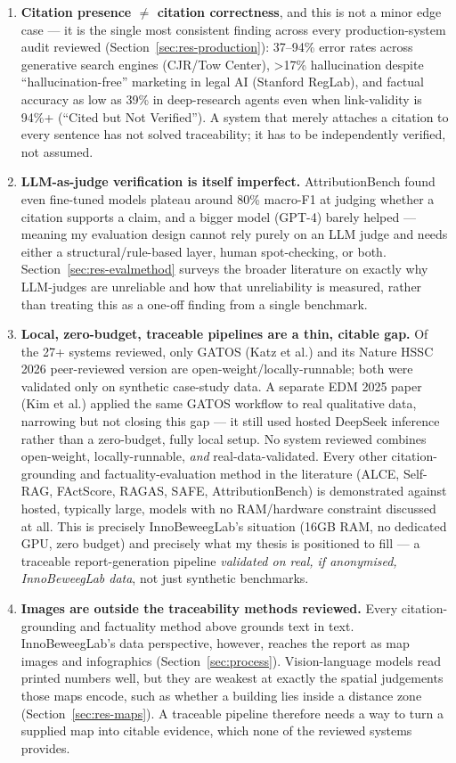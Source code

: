 \begin{enumerate}
\item \textbf{Citation presence $\neq$ citation correctness}, and this is not a minor edge case — it is the single most consistent finding across every production-system audit reviewed (Section~\ref{sec:res-production}): 37–94\% error rates across generative search engines (CJR/Tow Center), >17\% hallucination despite \textquotedblleft{}hallucination-free\textquotedblright{} marketing in legal AI (Stanford RegLab), and factual accuracy as low as 39\% in deep-research agents even when link-validity is 94\%+ (\textquotedblleft{}Cited but Not Verified\textquotedblright{}). A system that merely attaches a citation to every sentence has not solved traceability; it has to be independently verified, not assumed.
\item \textbf{LLM-as-judge verification is itself imperfect.} AttributionBench found even fine-tuned models plateau around 80\% macro-F1 at judging whether a citation supports a claim, and a bigger model (GPT-4) barely helped — meaning my evaluation design cannot rely purely on an LLM judge and needs either a structural/rule-based layer, human spot-checking, or both. Section~\ref{sec:res-evalmethod} surveys the broader literature on exactly why LLM-judges are unreliable and how that unreliability is measured, rather than treating this as a one-off finding from a single benchmark.
\item \textbf{Local, zero-budget, traceable pipelines are a thin, citable gap.} Of the 27+ systems reviewed, only GATOS (Katz et al.) and its Nature HSSC 2026 peer-reviewed version are open-weight/locally-runnable; both were validated only on synthetic case-study data. A separate EDM 2025 paper (Kim et al.) applied the same GATOS workflow to real qualitative data, narrowing but not closing this gap — it still used hosted DeepSeek inference rather than a zero-budget, fully local setup. No system reviewed combines open-weight, locally-runnable, \textit{and} real-data-validated. Every other citation-grounding and factuality-evaluation method in the literature (ALCE, Self-RAG, FActScore, RAGAS, SAFE, AttributionBench) is demonstrated against hosted, typically large, models with no RAM/hardware constraint discussed at all. This is precisely InnoBeweegLab's situation (16GB RAM, no dedicated GPU, zero budget) and precisely what my thesis is positioned to fill — a traceable report-generation pipeline \textit{validated on real, if anonymised, InnoBeweegLab data}, not just synthetic benchmarks.
\item \textbf{Images are outside the traceability methods reviewed.} Every citation-grounding and factuality method above grounds text in text. InnoBeweegLab's data perspective, however, reaches the report as map images and infographics (Section~\ref{sec:process}). Vision-language models read printed numbers well, but they are weakest at exactly the spatial judgements those maps encode, such as whether a building lies inside a distance zone (Section~\ref{sec:res-maps}). A traceable pipeline therefore needs a way to turn a supplied map into citable evidence, which none of the reviewed systems provides.
\end{enumerate}

